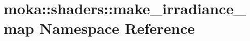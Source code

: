 \hypertarget{namespacemoka_1_1shaders_1_1make__irradiance__map}{}\section{moka\+::shaders\+::make\+\_\+irradiance\+\_\+map Namespace Reference}
\label{namespacemoka_1_1shaders_1_1make__irradiance__map}
